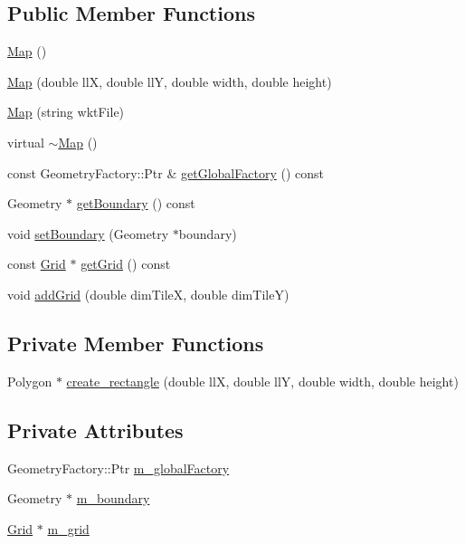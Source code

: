 \subsection*{Public Member Functions}
\begin{DoxyCompactItemize}
\item 
\hyperlink{class_map_a0f5ad0fd4563497b4214038cbca8b582}{Map} ()
\item 
\hyperlink{class_map_a4c9545a0252613e2a6808932fe83f9ad}{Map} (double llX, double llY, double width, double height)
\item 
\hyperlink{class_map_ab8beab7a7dce782a23db740cd7132552}{Map} (string wkt\+File)
\item 
virtual \hyperlink{class_map_ac1ab46138aa61acd0a58b1fd21e0df37}{$\sim$\+Map} ()
\item 
const Geometry\+Factory\+::\+Ptr \& \hyperlink{class_map_a69bd639b05daa393b051c76f0dc4af7c}{get\+Global\+Factory} () const
\item 
Geometry $\ast$ \hyperlink{class_map_a74dd5445ed90bea2a9cc3240bc23f1bc}{get\+Boundary} () const
\item 
void \hyperlink{class_map_acede2ccba9bf0f987f3dde8c332bec17}{set\+Boundary} (Geometry $\ast$boundary)
\item 
const \hyperlink{class_grid}{Grid} $\ast$ \hyperlink{class_map_aa9bf1c29b844f3b7fbf7a3153c24fef0}{get\+Grid} () const
\item 
void \hyperlink{class_map_aa3dba78a0b52b304c39d1fa6bff71b00}{add\+Grid} (double dim\+TileX, double dim\+TileY)
\end{DoxyCompactItemize}
\subsection*{Private Member Functions}
\begin{DoxyCompactItemize}
\item 
Polygon $\ast$ \hyperlink{class_map_a36539152d451138361d82469218b4661}{create\+\_\+rectangle} (double llX, double llY, double width, double height)
\end{DoxyCompactItemize}
\subsection*{Private Attributes}
\begin{DoxyCompactItemize}
\item 
Geometry\+Factory\+::\+Ptr \hyperlink{class_map_ac5f30e6c144955a3638192495fd7d843}{m\+\_\+global\+Factory}
\item 
Geometry $\ast$ \hyperlink{class_map_af2c95561cb4ff3b9950240351cf4303c}{m\+\_\+boundary}
\item 
\hyperlink{class_grid}{Grid} $\ast$ \hyperlink{class_map_a0fc16621dbe307d36170c3a96b24b7d9}{m\+\_\+grid}
\end{DoxyCompactItemize}


